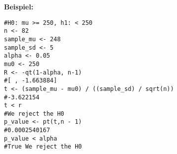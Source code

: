 \large{\textbf{Beispiel:}}
\begin{lstlisting}
#H0: mu >= 250, h1: < 250
n <- 82
sample_mu <- 248
sample_sd <- 5
alpha <- 0.05
mu0 <- 250
R <- -qt(1-alpha, n-1)
#[ , -1.663884]
t <- (sample_mu - mu0) / ((sample_sd) / sqrt(n))
#-3.622154
t < r
#We reject the H0
p_value <- pt(t,n - 1)
#0.0002540167
p_value < alpha
#True We reject the H0
\end{lstlisting}
\columnbreak